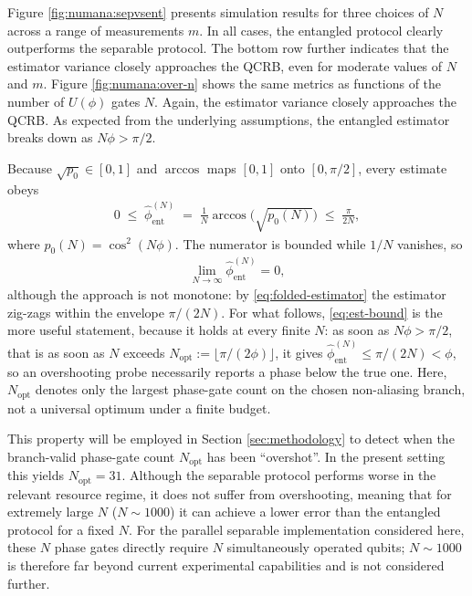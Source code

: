 Figure \ref{fig:numana:sepvsent} presents simulation results for three choices of $N$ across 
a range of measurements $m$.
In all cases, the entangled protocol clearly outperforms the separable protocol.
The bottom row further indicates that the estimator variance closely 
approaches the QCRB, even for moderate values of $N$ and $m$.
Figure \ref{fig:numana:over-n} shows the same metrics as functions of the number of  
$U(\phi)$ gates $N$. Again, the estimator variance closely approaches the QCRB.
As expected from the underlying assumptions, the entangled estimator
breaks down as $N \phi > \pi/2$.

Because $\sqrt{p_0} \in [0,1]$ and $\arccos$ maps $[0,1]$ onto $[0,\pi/2]$, every estimate obeys
\begin{align}
  0 \;\leq\; \hat\phi_{\text{ent}}^{(N)} \;=\; \frac{1}{N}\arccos\!\bigl(\sqrt{p_0(N)}\bigr)
    \;\leq\; \frac{\pi}{2N},
  \label{eq:est-bound}
\end{align}
where $p_0(N) = \cos^2(N\phi)$. The numerator is bounded while $1/N$ vanishes, so
\begin{align}
  \lim_{N\to\infty} \hat\phi_{\text{ent}}^{(N)} = 0,
  \label{eq:est-conv}
\end{align}
although the approach is not monotone: by \eqref{eq:folded-estimator} the estimator zig-zags within
the envelope $\pi/(2N)$. For what follows, \eqref{eq:est-bound} is the more useful statement,
because it holds at every finite $N$: as soon as $N\phi > \pi/2$, that is as soon as $N$ exceeds
$N_\text{opt}:=\lfloor\pi/(2\phi)\rfloor$, it gives $\hat\phi_{\text{ent}}^{(N)} \leq \pi/(2N) < \phi$, so an overshooting
probe necessarily reports a phase below the true one.
Here, $N_\text{opt}$ denotes only the largest phase-gate count on the chosen non-aliasing branch, not a universal optimum under a finite budget.


This property will be employed in Section \ref{sec:methodology} to detect
when the branch-valid phase-gate count $N_\text{opt}$ has been ``overshot''.
In the present setting this yields $N_\text{opt}=31$.
Although the separable protocol performs worse in the relevant resource regime, it does not suffer from overshooting, meaning 
that for extremely large $N$ ($N \sim 1000$) it can achieve a lower error than the entangled protocol for a fixed $N$.
For the parallel separable implementation considered here, these $N$ phase gates directly require $N$ simultaneously operated qubits;
$N\sim1000$ is therefore far beyond current experimental capabilities and is not considered further.

